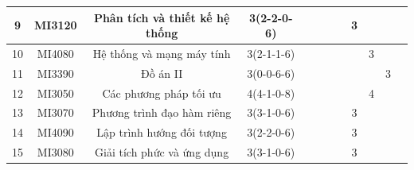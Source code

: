 \documentclass[12pt,a4paper]{report}
\begin{document}
\begin{landscape}
\begin{longtable}[c]{|c|c|c|c|c|c|c|c|c|c|c|c|}
        9                             & MI3120                          & Phân tích và thiết kế hệ thống                               & 3(2-2-0-6)                                                                           &             &             &             &             & 3           &             &             &             \\ \hline
        10                            & MI4080                          & Hệ thống và mạng máy tính                                    & 3(2-1-1-6)                                                                           &             &             &             &             &             & 3           &             &             \\ \hline
        11                            & MI3390                          & Đồ án II                                                     & 3(0-0-6-6)                                                                           &             &             &             &             &             &             & 3           &             \\ \hline
        12                            & MI3050                          & Các phương pháp tối ưu                                       & 4(4-1-0-8)                                                                           &             &             &             &             &             & 4           &             &             \\ \hline
        13                            & MI3070                          & Phương trình đạo hàm riêng                                   & 3(3-1-0-6)                                                                           &             &             &             &             & 3           &             &             &             \\ \hline
        14                            & MI4090                          & Lập trình hướng đối tượng                                    & 3(2-2-0-6)                                                                           &             &             &             &             & 3           &             &             &             \\ \hline
        15                            & MI3080                          & Giải tích phức và ứng dụng                                   & 3(3-1-0-6)                                                                           &             &             &             &             & 3           &             &             &             \\ \hline

\end{longtable}
\end{landscape}
\end{document}
